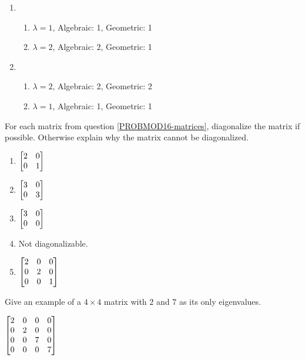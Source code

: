 \begin{exercises}
\begin{problist}
\begin{solution}
\begin{enumerate}
				\item
					\begin{enumerate}
						\item $\lambda=1$, Algebraic: 1,
							Geometric: 1

						\item $\lambda=2$, Algebraic: 2,
							Geometric: 1
					\end{enumerate}%


				\item
					\begin{enumerate}
						\item $\lambda=2$, Algebraic: 2,
							Geometric: 2

						\item $\lambda=1$, Algebraic: 1,
							Geometric: 1
					\end{enumerate}
			\end{enumerate}
		\end{solution}\prob For each matrix from question \ref{PROBMOD16-matrices},
		diagonalize the matrix if possible. Otherwise explain why the matrix cannot
		be diagonalized. %

		\begin{solution}

			\begin{enumerate}
				\item $\mat{2&0\\0&1}$

				\item $\mat{3&0\\0&3}$

				\item $\mat{3&0\\0&0}$

				\item Not diagonalizable.

				\item $\mat{2&0&0\\0&2&0\\0&0&1}$
			\end{enumerate}
		\end{solution}

		\prob Give an example of a $4\times 4$ matrix with $2$ and $7$
		as its only eigenvalues.
		\begin{solution}

				$\mat{2&0&0&0\\0&2&0&0\\0&0&7&0\\0&0&0&7}$
		\end{solution}


\end{problist}
\end{exercises}
